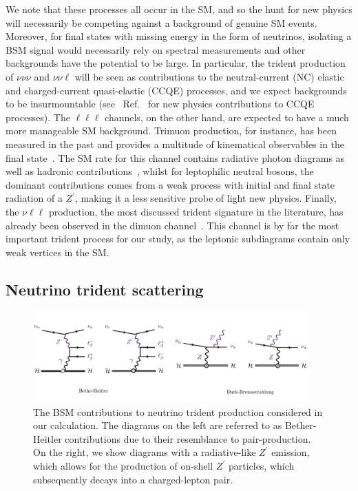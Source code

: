 We note that these processes all occur in the SM, and so the hunt for new physics will necessarily be competing against a background of genuine SM events. Moreover, for final states with missing energy in the form of neutrinos, isolating a BSM signal would necessarily rely on spectral measurements and other backgrounds have the potential to be large. In particular, the trident production of $\nu\nu\nu$ and $\nu\nu\ell$ will be seen as contributions to the neutral-current (NC) elastic and charged-current quasi-elastic (CCQE) processes, and we expect backgrounds to be insurmountable (see \eg\ Ref.~\cite{Kelly:2019wow} for new physics contributions to CCQE processes). The $\ell\ell\ell$ channels, on the other hand, are expected to have a much more manageable SM background. Trimuon production, for instance, has been measured in the past and provides a multitude of kinematical observables in the final state~\cite{Holder:1977gp,KayisTopaksu:2004ea}. The SM rate for this channel contains radiative photon diagrams as well as hadronic contributions~\cite{Benvenuti1977,Barish1977,Smith1978}, whilst for leptophilic neutral bosons, the dominant  contributions comes from a weak process with initial and final state radiation of a $Z^\prime$, making it a less sensitive probe of light new physics. Finally, the $\nu \ell \ell$ production, the most discussed trident signature in the literature, has already been observed in the dimuon channel~\cite{Geiregat:1990gz,Mishra:1991bv,Goncharov:2001qe}. This channel is by far the most important trident process for our study, as the leptonic subdiagrams contain only weak vertices in the SM.

\subsection{Neutrino trident scattering}

\begin{figure}
    \centering
    \includegraphics[width=0.94\textwidth]{tridentdiagrams.pdf}
\caption{The BSM contributions to neutrino trident production considered in our calculation. The diagrams on the left are referred to as Bether-Heitler contributions due to their resemblance to pair-production. On the right, we show diagrams with a radiative-like $Z^\prime$ emission, which allows for the production of on-shell $Z^\prime$ particles, which subsequently decays into a charged-lepton pair.\label{fig:trident_diagrams}}
\end{figure}


